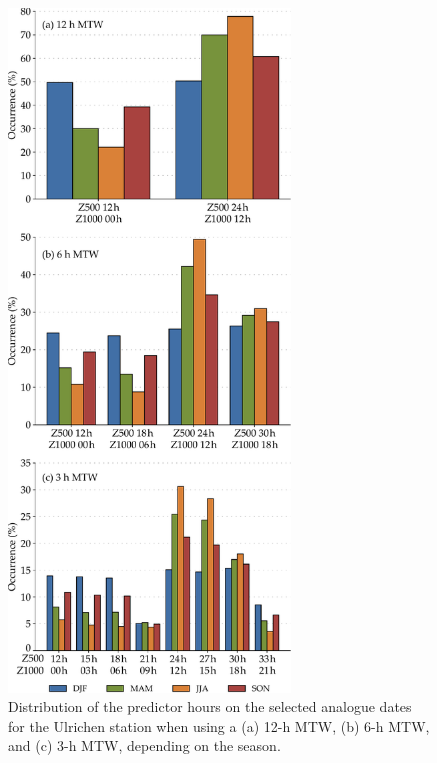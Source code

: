 \documentclass[hess, manuscript]{copernicus}
\begin{document}
	\begin{figure}[htb]
		\includegraphics[width=7.5cm]{fig07.pdf}
		\caption{Distribution of the predictor hours on the selected analogue dates for the Ulrichen station when using a (a) 12-h MTW, (b) 6-h MTW, and (c) 3-h MTW, depending on the season.}
		\label{fig:hours_selection_per_season}
	\end{figure}
\end{document}
